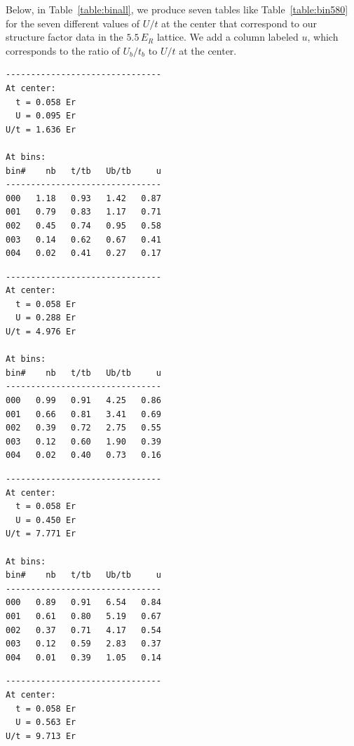 \documentclass[11pt,letter]{article}
\begin{document}
Below, in Table~\ref{table:binall}, we produce seven tables like
Table~\ref{table:bin580} for the seven different values of $U/t$ at the center
that correspond to our structure factor data in the $5.5\,E_{R}$ lattice.  We
add a column labeled $u$, which corresponds to the ratio of $U_{b}/t_{b}$ to
$U/t$ at the center.   
\begin{table}
\vspace{4em}
{ \scriptsize
\begin{minipage}[b][10em][b]{0.33\textwidth}
\begin{verbatim}
-------------------------------
At center:
  t = 0.058 Er
  U = 0.095 Er
U/t = 1.636 Er

At bins:
bin#    nb   t/tb   Ub/tb     u     
-------------------------------
000   1.18   0.93   1.42   0.87
001   0.79   0.83   1.17   0.71
002   0.45   0.74   0.95   0.58
003   0.14   0.62   0.67   0.41
004   0.02   0.41   0.27   0.17
\end{verbatim}
\end{minipage}
\begin{minipage}[b][10em][b]{0.33\textwidth}
\begin{verbatim}
-------------------------------
At center:
  t = 0.058 Er
  U = 0.288 Er
U/t = 4.976 Er

At bins:
bin#    nb   t/tb   Ub/tb     u     
-------------------------------
000   0.99   0.91   4.25   0.86
001   0.66   0.81   3.41   0.69
002   0.39   0.72   2.75   0.55
003   0.12   0.60   1.90   0.39
004   0.02   0.40   0.73   0.16
\end{verbatim}
\end{minipage}
\begin{minipage}[b][10em][b]{0.33\textwidth}
\begin{verbatim}
-------------------------------
At center:
  t = 0.058 Er
  U = 0.450 Er
U/t = 7.771 Er

At bins:
bin#    nb   t/tb   Ub/tb     u     
-------------------------------
000   0.89   0.91   6.54   0.84
001   0.61   0.80   5.19   0.67
002   0.37   0.71   4.17   0.54
003   0.12   0.59   2.83   0.37
004   0.01   0.39   1.05   0.14
\end{verbatim}
\end{minipage}

\vspace{8em}

\begin{minipage}[b][10em][b]{0.33\textwidth}
\begin{verbatim}
-------------------------------
At center:
  t = 0.058 Er
  U = 0.563 Er
U/t = 9.713 Er


\end{verbatim}
\end{minipage}}
\end{table}
\end{document}
